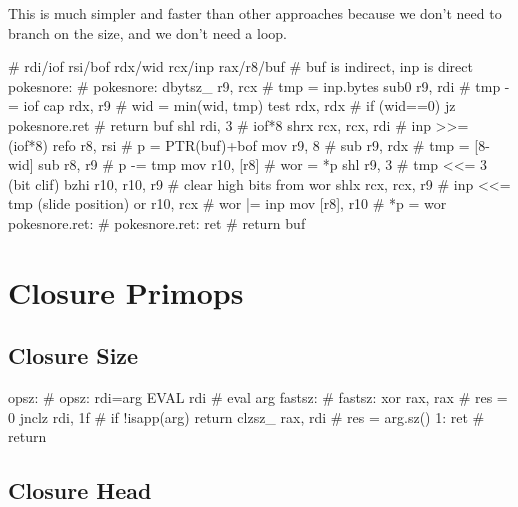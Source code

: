 This is much simpler and faster than other approaches because we don't
need to branch on the size, and we don't need a loop.

\begin{asm}
	# rdi/iof rsi/bof rdx/wid rcx/inp rax/r8/buf
	# buf is indirect, inp is direct
pokesnore:                                  # pokesnore:
	dbytsz_	r9, rcx                     #   tmp  = inp.bytes
	sub0	r9, rdi                     #   tmp -= iof
	cap	rdx, r9                     #   wid = min(wid, tmp)
	test	rdx, rdx                    #   if (wid==0)
	jz	pokesnore.ret               #     return buf
	shl	rdi, 3                      #   iof*8
	shrx	rcx, rcx, rdi               #   inp >>= (iof*8)
	refo	r8, rsi                     #   p = PTR(buf)+bof
	mov	r9, 8                       #
	sub	r9, rdx                     #   tmp = [8-wid]
	sub	r8, r9                      #   p -= tmp
	mov	r10, [r8]                   #   wor = *p
	shl	r9, 3                       #   tmp <<= 3 (bit clif)
	bzhi	r10, r10, r9                #   clear high bits from wor
	shlx	rcx, rcx, r9                #   inp <<= tmp (slide position)
	or	r10, rcx                    #   wor |= inp
	mov	[r8], r10                   #   *p = wor
pokesnore.ret:                              # pokesnore.ret:
	ret                                 #   return buf
\end{asm}

\section{Closure Primops}

\subsection{Closure Size}

\begin{asm}
opsz:                                       # opsz: rdi=arg
	EVAL	rdi                         #   eval arg
fastsz:                                     # fastsz:
	xor	rax, rax                    #   res = 0
	jnclz	rdi, 1f                     #   if !isapp(arg) return
	clzsz_	rax, rdi                    #   res = arg.sz()
1:	ret                                 #   return
\end{asm}


\subsection{Closure Head}

